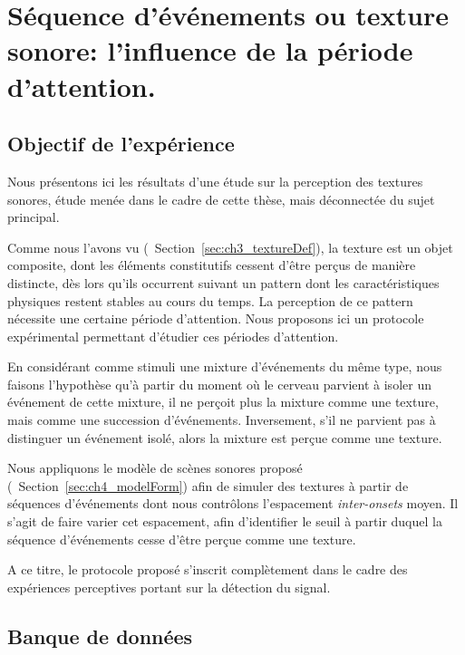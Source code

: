 \chapter[Expérience annexe: période d'attention]{Séquence d'événements ou texture sonore: l'influence de la période d'attention.}
\label{app:xp_texture}

\section{Objectif de l'expérience}

Nous présentons ici les résultats d'une étude sur la perception des textures sonores, étude menée dans le cadre de cette thèse, mais déconnectée du sujet principal. 

Comme nous l'avons vu (\cf~Section~\ref{sec:ch3_textureDef}), la texture est un objet composite, dont les éléments constitutifs cessent d'être perçus de manière distincte, dès lors qu'ils occurrent suivant un pattern dont les caractéristiques physiques restent stables au cours du temps. La perception de ce pattern nécessite une certaine période d'attention. Nous proposons ici un protocole expérimental permettant d'étudier ces périodes d'attention.


En considérant comme stimuli une mixture d'événements du même type, nous faisons l'hypothèse qu'à partir du moment où le cerveau parvient à isoler un événement de cette mixture, il ne perçoit plus la mixture comme une texture, mais comme une succession d'événements. Inversement, s'il ne parvient pas à distinguer un événement isolé, alors la mixture est perçue comme une texture.

Nous appliquons le modèle de scènes sonores proposé (\cf~Section~\ref{sec:ch4_modelForm}) afin de simuler des textures à partir de séquences d'événements dont nous contrôlons l'espacement \emph{inter-onsets} moyen. Il s'agit de faire varier cet espacement, afin d’identifier le seuil à partir duquel la séquence d'événements cesse d'être perçue comme une texture. 

A ce titre, le protocole proposé s'inscrit complètement dans le cadre des expériences perceptives portant sur la détection du signal.

\section{Banque de données}


